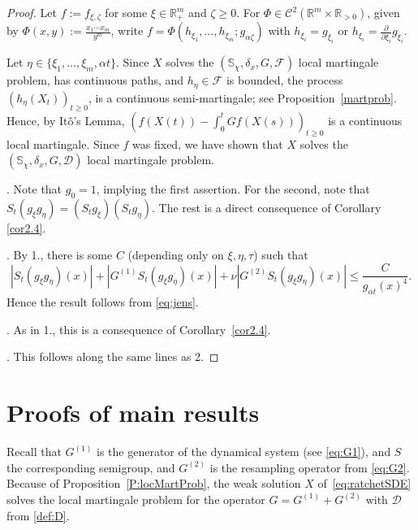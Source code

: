 \documentclass{imsart}
\theoremstyle{plain}
\theoremstyle{definition}
\begin{document}
\begin{proof}
Let $f := f_{\xi, {\zeta}}$ for some $\xi \in \mathbb R_+^m$ and ${\zeta \geq 0}$. For $\Phi \in \mathcal C^2(\mathbb R^{m} \times \mathbb R_{>0})$, given by $\Phi(x,y) := \frac{x_1\cdots x_m}{y^m}$, write $f = \Phi(h_{ \xi_1},...,h_{ \xi_m}; g_{\alpha {\zeta}})$ with $h_{\xi_i} = {g}_{\xi_i}$ or $h_{\xi_i} = \frac{\partial}{\partial {\xi_i}} {g}_{\xi_i}$. 

{
Let $\eta \in \{\xi_1,...,\xi_m, \alpha t\}$. Since $X$ solves the $(\mathbb S_\chi, \delta_x, G, \mathcal F)$ local martingale problem, has continuous paths, and $h_{\eta} \in \mathcal F$ is bounded, the process $(h_{\eta}(X_t))_{t\geq 0}$, is a continuous semi-martingale; see Proposition~\ref{martprob}.} Hence, by It\^o's Lemma, $(f(X(t)) - \int_0^t Gf(X(s)))_{t\geq 0}$ is a continuous local martingale. Since $f$ was fixed, we have shown that $X$ solves the $(\mathbb S_{\chi}, \delta_x, G, \mathcal D)$ local martingale problem. 

. Note that $g_0 = 1$, implying the first assertion. For the second, note that $S_t (g_{ \xi} g_{ \eta}) = (S_t g_{ \xi})(S_t g_{ \eta})$. The rest is a direct consequence of Corollary \ref{cor2.4}. 

. By 1., there is some $C$ (depending only on $\xi, \eta, \tau$) such that
$$ |S_t (g_{ \xi} g_{ \eta})(x)| + |G^{(1)} S_t (g_{ \xi} g_{ \eta})(x)| + \nu |G^{(2)} S_t (g_{ \xi} g_{ \eta})(x)| \leq \frac{C}{g_{\alpha t}(x)^4}.$$
Hence the result follows from \eqref{eq:jens}.

. As in 1., this is a consequence of Corollary~\ref{cor2.4}. 

. This follows along the same lines as 2.
\end{proof}


\section{Proofs of main results}

Recall that $G^{(1)}$ is the generator of the dynamical system (see \eqref{eq:G1}), and $S$ the corresponding semigroup, and $G^{(2)}$ is the resampling operator from \eqref{eq:G2}. Because of Proposition~\ref{P:locMartProb}, the weak solution $X$ of~\eqref{eq:ratchetSDE} solves the local martingale problem for the operator $G=G^{(1)} + G^{(2)}$ with $\mathcal D$ from \eqref{def:D}. 
\end{document}
